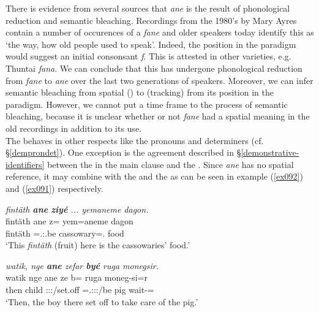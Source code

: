 There is evidence from several sources that \emph{ane} is the result of phonological reduction and semantic bleaching. Recordings from the 1980's by Mary Ayres contain a number of occurences of a  \emph{fane} and older speakers today identify this as `the way, how old people used to speak'. Indeed, the position in the paradigm would suggest an initial consonsant \emph{f}. This is attested in other  varieties, e.g.  Thuntai \emph{fana}. We can conclude that this  has undergone phonological reduction from \emph{fane} to \emph{ane} over the last two generations of speakers. Moreover, we can infer semantic bleaching from spatial () to  (tracking) from its position in the paradigm. However, we cannot put a time frame to the process of semantic bleaching, because it is unclear whether or not \emph{fane} had a spatial meaning in the old recordings in addition to its  use.\\

The   behaves in other respects like the  pronouns and determiners (cf. \S{}\ref{demprondet}). One exception is the agreement described in \S{}\ref{demonstrative-identifiers} between the  in the main clause and the  . Since \emph{ane} has no spatial reference, it may combine with the  and the    as can be seen in example (\ref{ex092}) and (\ref{ex091}) respectively.

\begin{exe}
	\ex \emph{fintäth \textbf{ane} \textbf{ziyé} ... yemaneme dagon.}\\
	\gll fintäth ane z= yem=aneme dagon\\
	fintäth \Dem{} \Prox=\Tsg.\Masc:\Nonpast.be cassowary=\Poss{}.\Nsg{} food\\
	\trans `This \emph{fintäth} (fruit) here is the cassowaries' food.'\\
	\label{ex092}
\end{exe}
\begin{exe}
	\ex \emph{watik, nge \textbf{ane} zefar \textbf{byé} ruga monegsir.}\\
	\gll watik nge ane ze b= ruga moneg-si=r\\
	then child \Dem{} \Stsg:\Sbj:\Rpst:\Pfv/set.off \Med{}=\Tsg.\Masc:\Sbj:\Nonpast:\Ipfv/be pig wait-\Nmlz{}=\Purp{}\\
	\trans `Then, the boy there set off to take care of the pig.'
	\label{ex091}
\end{exe}

